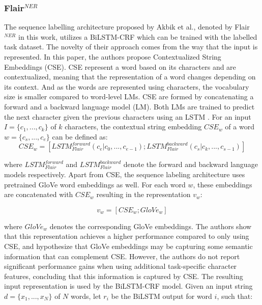 \documentclass{report}
\theoremstyle{definition}
\theoremstyle{remark}
\begin{document}
\subsubsection{Flair$^{NER}$}
The sequence labelling architecture proposed by Akbik et al., denoted by Flair$^{NER}$ in this work, utilizes a BiLSTM-CRF \cite{BiLSTMCRF} which can be trained with the labelled task dataset. The novelty of their approach comes from the way that the input is represented. In this paper, the authors propose Contextualized String Embeddings (CSE). CSE represent a word based on its characters and are contextualized, meaning that the representation of a word changes depending on its context. And as the words are represented using characters, the vocabulary size is smaller compared to word-level LMs. CSE are formed by concatenating a forward and a backward language model (LM). Both LMs are trained to predict the next character given the previous characters using an LSTM \cite{lstm}. For an input $I=\{c_1,...,c_k\}$ of $k$ characters, the contextual string embedding $CSE_w$ of a word $w=\{c_s,...,c_e\}$ can be defined as:
\begin{equation}
    CSE_w = [ LSTM^{forward}_{Flair}(c_e | c_0,...,c_{e-1}); LSTM^{backward}_{Flair}(c_s | c_k,...,c_{s-1}) ]
\end{equation}

\noindent where $LSTM^{forward}_{Flair}$ and $LSTM^{backward}_{Flair}$ denote the forward and backward language models respectively. Apart from CSE, the sequence labeling architecture uses pretrained GloVe \cite{glove} word embeddings as well. For each word $w$, these embeddings are concatenated with $CSE_w$ resulting in the representation $v_w$:

\begin{equation}
    v_w = [CSE_w;GloVe_w]
\end{equation}

\noindent where $GloVe_w$ denotes the corresponding GloVe embeddings. The authors show that this representation achieves a higher performance compared to only using CSE, and hypothesize that GloVe embeddings may be capturing some semantic information that can complement CSE. However, the authors do not report significant performance gains when using additional task-specific character features, concluding that this information is captured by CSE. The resulting input representation is used by the BiLSTM-CRF model. Given an input string $d=\{x_1,...,x_N\}$ of $N$ words, let $r_i$ be the BiLSTM output for word $i$, such that:
\end{document}
